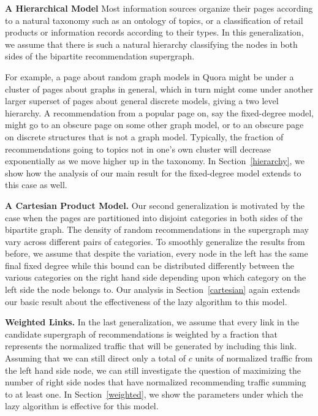 {\bf A Hierarchical Model} 
Most information sources organize their pages according to a natural taxonomy
such as an ontology of topics, or a classification of retail products or
information records according to their types. In this generalization, we assume
that there is such a natural hierarchy classifying the nodes in both sides of
the bipartite recommendation supergraph. 


For example, a page about random graph models in Quora might be under a cluster
of pages about graphs in general, which in turn might come under another larger
superset of pages about general discrete models, giving a two level hierarchy.
A recommendation from a popular page on, say the fixed-degree model, might go to
an obscure page on some other graph model, or to an obscure page on discrete
structures that is not a graph model. Typically, the fraction of recommendations
going to topics not in one's own cluster will decrease exponentially as we move
higher up in the taxonomy. In Section~\ref{hierarchy}, we show how the analysis
of our main result for the fixed-degree model extends to this case as well. \vs

{\bf A Cartesian Product Model.}
Our second generalization is motivated by the case when the pages are
partitioned into disjoint categories in both sides of the bipartite graph. The
density of random recommendations in the supergraph may vary across different
pairs of categories. To smoothly generalize the results from before, we assume
that despite the variation, every node in the left has the same final fixed
degree while this bound can be distributed differently between the various
categories on the right hand side depending upon which category on the left side
the node belongs to.  Our analysis in Section~\ref{cartesian} again extends our
basic result about the effectiveness of the lazy algorithm to this model.\vs

{\bf Weighted Links.}
In the last generalization, we assume that every link in the candidate
supergraph of recommendations is weighted by a fraction that represents the
normalized traffic that will be generated by including this link. Assuming that
we can still direct only a total of $c$ units of normalized traffic from the
left hand side node, we can still investigate the question of maximizing the
number of right side nodes that have normalized recommending traffic summing to
at least one. In Section~\ref{weighted}, we show the parameters under which the
lazy algorithm is effective for this model. \vs

